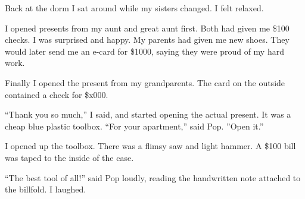 Back at the dorm I sat around while my sisters changed.  I felt relaxed.

I opened presents from my aunt and great aunt first.  Both had given me \$100
checks.  I was surprised and happy.  My parents had given me new shoes.  They
would later send me an e-card for \$1000, saying they were proud of my hard
work.  

Finally I opened the present from my grandparents.  The card on the outside
contained a check for \$x000.  

``Thank you so much,'' I said, and started opening the actual present.  It was a
cheap blue plastic toolbox.  ``For your apartment,'' said Pop.  ''Open it.''

I opened up the toolbox.  There was a flimsy saw and light hammer.  A \$100 bill
was taped to the inside of the case.

``The best tool of all!'' said Pop loudly, reading the handwritten note attached
to the billfold.  I laughed.
